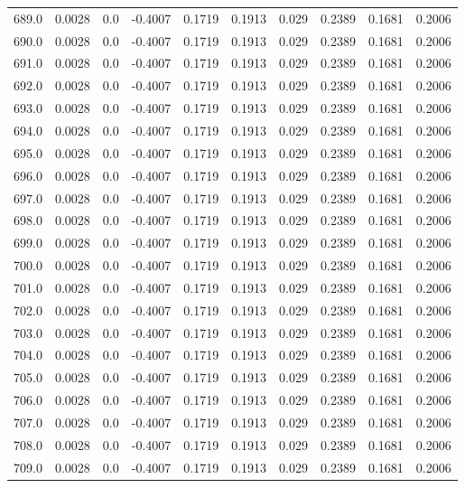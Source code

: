 \begin{longtable}{lrrrrrrrrr}
689.0 & 0.0028 & 0.0 & -0.4007 & 0.1719 & 0.1913 & 0.029 & 0.2389 & 0.1681 & 0.2006 \\
690.0 & 0.0028 & 0.0 & -0.4007 & 0.1719 & 0.1913 & 0.029 & 0.2389 & 0.1681 & 0.2006 \\
691.0 & 0.0028 & 0.0 & -0.4007 & 0.1719 & 0.1913 & 0.029 & 0.2389 & 0.1681 & 0.2006 \\
692.0 & 0.0028 & 0.0 & -0.4007 & 0.1719 & 0.1913 & 0.029 & 0.2389 & 0.1681 & 0.2006 \\
693.0 & 0.0028 & 0.0 & -0.4007 & 0.1719 & 0.1913 & 0.029 & 0.2389 & 0.1681 & 0.2006 \\
694.0 & 0.0028 & 0.0 & -0.4007 & 0.1719 & 0.1913 & 0.029 & 0.2389 & 0.1681 & 0.2006 \\
695.0 & 0.0028 & 0.0 & -0.4007 & 0.1719 & 0.1913 & 0.029 & 0.2389 & 0.1681 & 0.2006 \\
696.0 & 0.0028 & 0.0 & -0.4007 & 0.1719 & 0.1913 & 0.029 & 0.2389 & 0.1681 & 0.2006 \\
697.0 & 0.0028 & 0.0 & -0.4007 & 0.1719 & 0.1913 & 0.029 & 0.2389 & 0.1681 & 0.2006 \\
698.0 & 0.0028 & 0.0 & -0.4007 & 0.1719 & 0.1913 & 0.029 & 0.2389 & 0.1681 & 0.2006 \\
699.0 & 0.0028 & 0.0 & -0.4007 & 0.1719 & 0.1913 & 0.029 & 0.2389 & 0.1681 & 0.2006 \\
700.0 & 0.0028 & 0.0 & -0.4007 & 0.1719 & 0.1913 & 0.029 & 0.2389 & 0.1681 & 0.2006 \\
701.0 & 0.0028 & 0.0 & -0.4007 & 0.1719 & 0.1913 & 0.029 & 0.2389 & 0.1681 & 0.2006 \\
702.0 & 0.0028 & 0.0 & -0.4007 & 0.1719 & 0.1913 & 0.029 & 0.2389 & 0.1681 & 0.2006 \\
703.0 & 0.0028 & 0.0 & -0.4007 & 0.1719 & 0.1913 & 0.029 & 0.2389 & 0.1681 & 0.2006 \\
704.0 & 0.0028 & 0.0 & -0.4007 & 0.1719 & 0.1913 & 0.029 & 0.2389 & 0.1681 & 0.2006 \\
705.0 & 0.0028 & 0.0 & -0.4007 & 0.1719 & 0.1913 & 0.029 & 0.2389 & 0.1681 & 0.2006 \\
706.0 & 0.0028 & 0.0 & -0.4007 & 0.1719 & 0.1913 & 0.029 & 0.2389 & 0.1681 & 0.2006 \\
707.0 & 0.0028 & 0.0 & -0.4007 & 0.1719 & 0.1913 & 0.029 & 0.2389 & 0.1681 & 0.2006 \\
708.0 & 0.0028 & 0.0 & -0.4007 & 0.1719 & 0.1913 & 0.029 & 0.2389 & 0.1681 & 0.2006 \\
709.0 & 0.0028 & 0.0 & -0.4007 & 0.1719 & 0.1913 & 0.029 & 0.2389 & 0.1681 & 0.2006 \\

\end{longtable}
